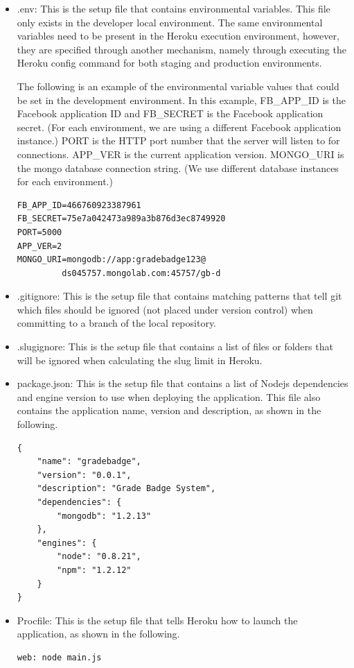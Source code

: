 \begin{itemize}
\item .env: This is the setup file that contains environmental variables. This file only exists in the developer local environment.  The same environmental variables need to be present in the Heroku execution environment, however, they are specified through another mechanism, namely through executing the Heroku config command for both staging and production environments.

The following is an example of the environmental variable values that could be set in the development environment. In this example, FB{\_}APP{\_}ID is the Facebook application ID and FB{\_}SECRET is the Facebook application secret. (For each environment, we are using a different Facebook application instance.)  PORT is the HTTP port number that the server will listen to for connections. APP{\_}VER is the current application version. MONGO{\_}URI is the mongo database connection string. (We use different database instances for each environment.)
\begin{lstlisting}
FB_APP_ID=466760923387961
FB_SECRET=75e7a042473a989a3b876d3ec8749920
PORT=5000
APP_VER=2
MONGO_URI=mongodb://app:gradebadge123@
         ds045757.mongolab.com:45757/gb-d
\end{lstlisting} 

\item .gitignore: This is the setup file that contains matching patterns that tell git which files should be ignored (not placed under version control) when committing to a branch of the local repository. 
\item .slugignore: This is the setup file that contains a list of files or folders that will be ignored when calculating the slug limit in Heroku.
\item package.json: This is the setup file that contains a list of Nodejs dependencies and engine version to use when deploying the application. This file also contains the application name, version and description, as shown in the following. 
\begin{lstlisting}
{
    "name": "gradebadge",
    "version": "0.0.1",
    "description": "Grade Badge System",
    "dependencies": {
        "mongodb": "1.2.13"
    },
    "engines": {
        "node": "0.8.21",
        "npm": "1.2.12"
    }
}
\end{lstlisting} 

\item Procfile: This is the setup file that tells Heroku how to launch the application, as shown in the following.
\begin{lstlisting}
web: node main.js
\end{lstlisting} 

\end{itemize}

